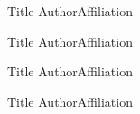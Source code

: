 \begin{talks}
\label{poster}
\item\talk
{Title}
{Author}{Affiliation}

\item\talk
{Title}
{Author}{Affiliation}

\item\talk
{Title}
{Author}{Affiliation}

\item\talk
{Title}
{Author}{Affiliation}
\end{talks}
\room
